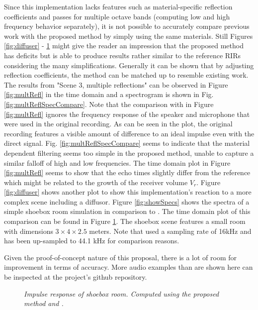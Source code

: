 \documentclass[twoside,a4paper]{article}
\begin{document}
Since this implementation lacks features such as material-specific reflection coefficients and passes for multiple octave bands (computing low and high frequency behavior separately), it is not possible to accurately compare previous work with the proposed method by simply using the same materials. Still Figures \ref{fig:diffuser} - \ref{fig:shoe} might give the reader an impression that the proposed method has deficits but is able to produce results rather similar to the reference RIRs considering the many simplifications. Generally it can be shown that by adjusting reflection coefficients, the method can be matched up to resemble existing work. \\
The results from "Scene 3, multiple reflections" can be observed in Figure \ref{fig:multRefl} in the time domain and a spectrogram is shown in Fig. \ref{fig:multReflSpecCompare}. Note that the comparison with \cite{brinkmann_round_2019} in Figure \ref{fig:multRefl} ignores the frequency response of the speaker and microphone that were used in the original recording. As can be seen in the plot, the original recording features a visible amount of difference to an ideal impulse even with the direct signal. Fig. \ref{fig:multReflSpecCompare} seems to indicate that the material dependent filtering seems too simple in the proposed method, unable to capture a similar falloff of high and low frequencies. The time domain plot in Figure \ref{fig:multRefl} seems to show that the echo times slightly differ from the reference which might be related to the growth of the receiver volume $V_r$.
Figure \ref{fig:diffuser} shows another plot to show this implementation's reaction to a more complex scene including a diffusor.  
Figure \ref{fig:showSpecs} shows the spectra of a simple shoebox room simulation in comparison to \cite{lehmann_fast_2020}. The time domain plot of this comparison can be found in Figure \ref{fig:shoe}. The shoebox scene features a small room with dimensions $3 \times 4 \times 2.5$ meters. Note that \cite{lehmann_fast_2020} used a sampling rate of 16kHz and has been up-sampled to 44.1 kHz for comparison reasons.

Given the proof-of-concept nature of this proposal, there is a lot of room for improvement in terms of accuracy. More audio examples than are shown here can be inspected at the project's github repository.



\begin{figure}
    \begin{center}
      
    \end{center}
    \caption{\label{fig:shoe} \it Impulse response of shoebox room. Computed using the proposed method and \cite{lehmann_fast_2020}. }
    
\end{figure}
\end{document}
